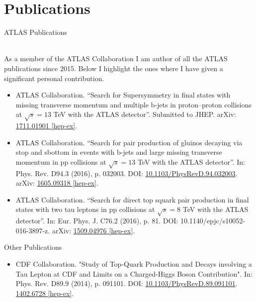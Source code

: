 \documentclass[11pt,a4paper]{moderncv}
\begin{document}
\section{Publications}
\color{color1}\begin{large}ATLAS Publications\end{large}\\ \color{black}
As a member of the ATLAS Collaboration I am author of all the ATLAS publications since 2015. Below I highlight the ones where I have given a significant personal contribution.
\begin{itemize} 
\item ATLAS Collaboration. “Search for Supersymmetry in final states with missing transverse momentum and multiple b-jets in proton–proton collisions at $\sqrt{s} = 13$ TeV with the ATLAS detector”. Submitted to JHEP. arXiv: \href{https://arxiv.org/abs/1711.01901}{\color{color1}1711.01901 [hep-ex]}. 
\item ATLAS Collaboration. “Search for pair production of gluinos decaying via stop and sbottom in events with b-jets and large missing transverse momentum in pp collisions at $\sqrt{s} = 13$ TeV with the ATLAS detector”. In: Phys. Rev. D94.3 (2016), p. 032003. DOI: \href{https://journals.aps.org/prd/abstract/10.1103/PhysRevD.94.032003}{\color{color1}10.1103/PhysRevD.94.032003}. arXiv: \href{https://arxiv.org/abs/1605.09318}{\color{color1}1605.09318 [hep-ex]}.
\item ATLAS Collaboration. “Search for direct top squark pair production in final states with two tau leptons in pp collisions at $\sqrt{s} = 8$ TeV with the ATLAS detector”. In: Eur. Phys. J. C76.2 (2016), p. 81. DOI: 10.1140/epjc/s10052-016-3897-z. arXiv: \href{https://arxiv.org/abs/1509.04976}{\color{color1}1509.04976 [hep-ex]}.
\end{itemize}
\par\medskip
\color{color1}\begin{large}Other Publications\end{large}\color{black}
\begin{itemize} 
\item CDF Collaboration. "Study of Top-Quark Production and Decays involving a Tau Lepton at CDF and Limits on a Charged-Higgs Boson Contribution". In: Phys. Rev. D89.9 (2014), p. 091101. DOI: \href{https://journals.aps.org/prd/abstract/10.1103/PhysRevD.89.091101}{\color{color1}10.1103/PhysRevD.89.091101}. \href{https://arxiv.org/abs/1402.6728}{\color{color1}1402.6728 [hep-ex]}.
\end{itemize}
\end{document}
